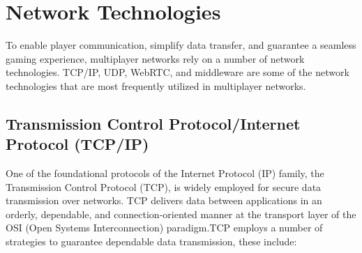 \section{Network Technologies}

To enable player communication, simplify data transfer, and guarantee a seamless gaming experience, multiplayer networks rely on a number of network technologies. TCP/IP, UDP, WebRTC, and middleware are some of the network technologies that are most frequently utilized in multiplayer networks.\cite{peterson2011computer}

\subsection{Transmission Control Protocol/Internet Protocol (TCP/IP)}
One of the foundational protocols of the Internet Protocol (IP) family, the Transmission Control Protocol (TCP), is widely employed for secure data transmission over networks. TCP delivers data between applications in an orderly, dependable, and connection-oriented manner at the transport layer of the OSI (Open Systems Interconnection) paradigm\cite{stevens2011tcp}.TCP employs a number of strategies to guarantee dependable data transmission, these include:
